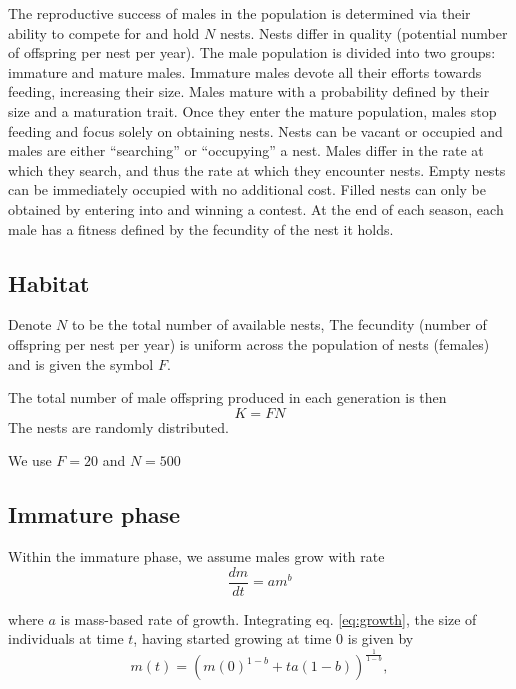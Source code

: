\documentclass[a4paper,11pt]{article}
\begin{document}
The reproductive success of males in the population is determined via their ability to compete for and hold $N$ nests. Nests differ in quality (potential number of offspring per nest per year). The male population is divided into two groups: immature and mature males. Immature males devote all their efforts towards feeding, increasing their size. Males mature with a probability defined by their size and a maturation trait. Once they enter the mature population, males stop feeding and focus solely on obtaining nests. Nests can be vacant or occupied and males are either ``searching'' or ``occupying'' a nest. Males differ in the rate at which they search, and thus the rate at which they encounter nests. Empty nests can be immediately occupied with no additional cost. Filled nests can only be obtained by entering into and winning a contest. At the end of each season, each male has a fitness defined by the fecundity of the nest it holds.

\subsection{Habitat}

Denote $N$ to be the total number of available nests, The fecundity (number of offspring per nest per year) is uniform across the population of nests (females) and is given the symbol $F$.

The total number of male offspring produced in each generation is then
\begin{equation} \label{eq:pdf_F}
    K = F N
\end{equation}
The nests are randomly distributed.

We use $F = 20$ and $N = 500$

\subsection{Immature phase}

Within the immature phase, we assume males grow with rate
\begin{equation} \label{eq:growth}
    \frac{dm}{dt} = a m^ b
\end{equation}

where $a$ is mass-based rate of growth. Integrating eq. \ref{eq:growth}, the size of individuals at time $t$, having started growing at time $0$ is given by
\begin{equation} \label{eq:growth}
    m(t) = \left(m(0)^{1-b} + t a(1-b)\right)^{\frac1{1-b}},
\end{equation}
\end{document}
